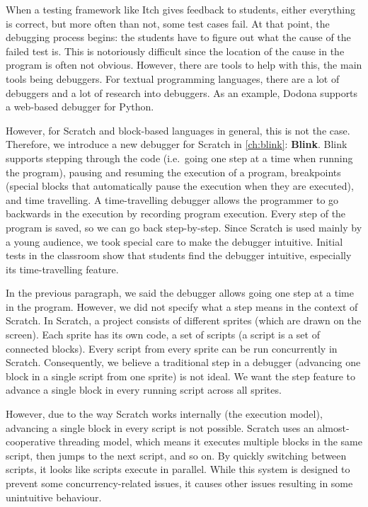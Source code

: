 \documentclass[main]{subfiles}
\begin{document}
When a testing framework like Itch gives feedback to students, either everything is correct, but more often than not, some test cases fail.
At that point, the debugging process begins: the students have to figure out what the cause of the failed test is.
This is notoriously difficult since the location of the cause in the program is often not obvious.
However, there are tools to help with this, the main tools being debuggers.
For textual programming languages, there are a lot of debuggers and a lot of research into debuggers.
As an example, Dodona supports a web-based debugger for Python.

However, for Scratch and block-based languages in general, this is not the case.
Therefore, we introduce a new debugger for Scratch in \cref{ch:blink}: \textbf{Blink}.
Blink supports stepping through the code (i.e.\ going one step at a time when running the program), pausing and resuming the execution of a program, breakpoints (special blocks that automatically pause the execution when they are executed), and time travelling.
A time-travelling debugger allows the programmer to go backwards in the execution by recording program execution.
Every step of the program is saved, so we can go back step-by-step.
Since Scratch is used mainly by a young audience, we took special care to make the debugger intuitive.
Initial tests in the classroom show that students find the debugger intuitive, especially its time-travelling feature.

In the previous paragraph, we said the debugger allows going one step at a time in the program.
However, we did not specify what a step means in the context of Scratch.
In Scratch, a project consists of different sprites (which are drawn on the screen).
Each sprite has its own code, a set of scripts (a script is a set of connected blocks).
Every script from every sprite can be run concurrently in Scratch.
Consequently, we believe a traditional step in a debugger (advancing one block in a single script from one sprite) is not ideal.
We want the step feature to advance a single block in every running script across all sprites.

However, due to the way Scratch works internally (the execution model), advancing a single block in every script is not possible.
Scratch uses an almost-cooperative threading model, which means it executes multiple blocks in the same script, then jumps to the next script, and so on.
By quickly switching between scripts,
it looks like scripts execute in parallel.
While this system is designed to prevent some concurrency-related issues, it causes other issues resulting in some unintuitive behaviour.
\end{document}
